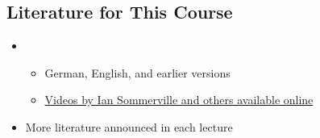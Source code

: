 \subsection{Literature for This Course}
\begin{frame}{\insertsubsection}
	\begin{fancycolumns}[animation=none]
		\centering{}
		\nextcolumn
		\begin{definition}{\mysource{\sommerville}}
			\begin{itemize}
				\item {}
				\begin{itemize}
					\item German, English, and earlier versions
					\item \href{https://software-engineering-book.com/videos/}{Videos by Ian Sommerville and others available online}
				\end{itemize}
				\item More literature announced in each lecture
			\end{itemize}
		\end{definition}
	\end{fancycolumns}
\end{frame}
